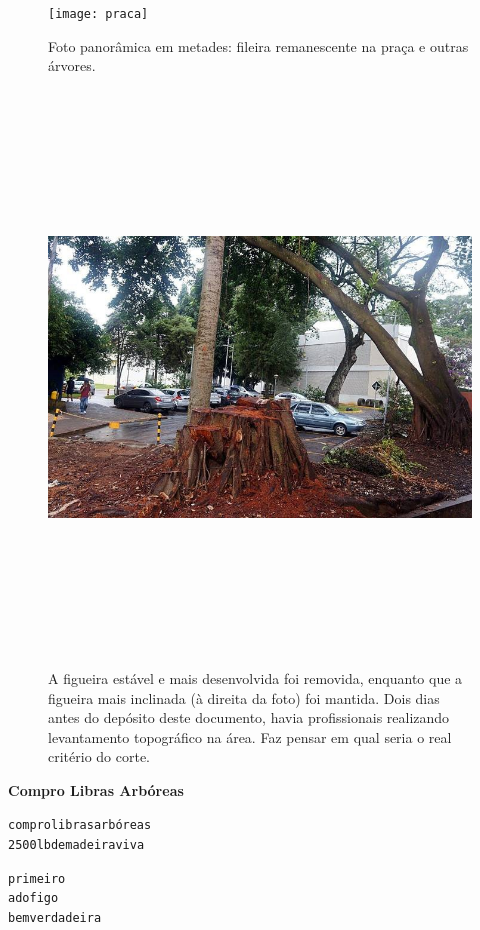 \documentclass[doutorado, pos-defesa, spanish, english, brazil, versalete, sumario=tradicional]{packages/icmc}
\begin{document}
\begin{anexosenv}
\begin{landscape}
\begin{figure}
\centering
\texttt{[image: praca]}
\caption*{Foto panorâmica em metades: fileira remanescente na praça e outras árvores.}
\end{figure}
\end{landscape}

\begin{landscape}
\begin{figure}
\centering
\includegraphics[height=15.2cm]{figue}
\caption*{A figueira estável e mais desenvolvida foi removida, enquanto que a figueira mais inclinada (à direita da foto) foi mantida. Dois dias antes do depósito deste documento, havia profissionais realizando  levantamento topográfico na área. Faz pensar em qual seria o real critério do corte.}
\end{figure}
\end{landscape}

\newpage
\textbf{Compro Libras Arbóreas}
\begin{alltt}
          compro libras arbóreas
       2500lb            de madeira viva
            
               primeiro
               a do figo
               bem verdadeira
               

\end{alltt}
\end{anexosenv}
\end{document}
